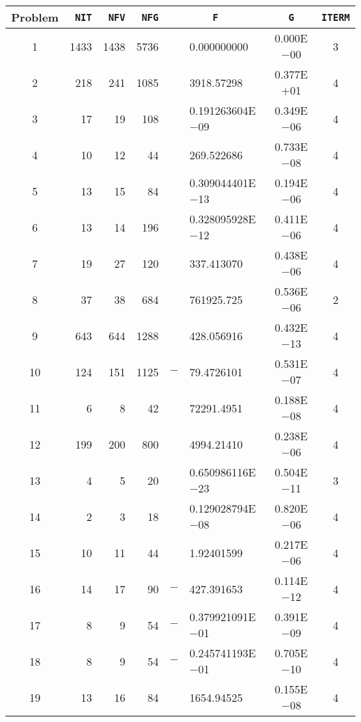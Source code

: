 \documentclass{esub2acm}
\begin{document}
\begin{table}
\footnotesize \centering
\begin{tabular}{c|rrrr@{}lcc} \hline
Problem\rule[-2pt]{0pt}{12pt}  & {\tt NIT} & {\tt NFV} & {\tt NFG}
& \multicolumn{2}{c}{\tt F} & {\tt G} & {\tt ITERM} \\ \hline
1\rule[-2pt]{0pt}{12pt} &   1433    &   1438    &   5736    &     &   0.000000000   &   0.000E$-$00 &   3   \\
2   &  218  &   241 &  1085 &       &   3918.57298  &   0.377E$+$01 &   4   \\
3   &   17  &   19  &   108 &       &   0.191263604E$-$09   &   0.349E$-$06 &   4   \\
4   &   10  &   12  &   44  &       &   269.522686  &   0.733E$-$08 &   4   \\
5   &   13  &   15  &   84  &       &   0.309044401E$-$13   &   0.194E$-$06 &   4   \\
6   &   13  &   14  &   196 &       &   0.328095928E$-$12   &   0.411E$-$06 &   4   \\
7   &   19  &   27  &   120 &       &   337.413070  &   0.438E$-$06 &   4   \\
8   &   37  &   38  &   684 &       &   761925.725  &   0.536E$-$06 &   2   \\
9   &   643 &   644 &  1288 &       &   428.056916  &   0.432E$-$13 &   4   \\
10  &   124 &   151 &  1125 &   $-$ &   79.4726101  &   0.531E$-$07 &   4   \\
11  &   6   &   8   &   42  &       &   72291.4951  &   0.188E$-$08 &   4   \\
12  &   199 &   200 &   800 &       &   4994.21410  &   0.238E$-$06 &   4   \\
13  &   4   &   5   &   20  &       &   0.650986116E$-$23   &   0.504E$-$11 &   3   \\
14  &   2   &   3   &   18  &       &   0.129028794E$-$08   &   0.820E$-$06 &   4   \\
15  &   10  &   11  &   44  &       &   1.92401599  &   0.217E$-$06 &   4   \\
16  &   14  &   17  &   90  &   $-$ &   427.391653  &   0.114E$-$12 &   4   \\
17  &   8   &   9   &   54  &   $-$ &   0.379921091E$-$01   &   0.391E$-$09 &   4   \\
18  &   8   &   9   &   54  &   $-$ &   0.245741193E$-$01   &   0.705E$-$10 &   4   \\
19  &   13  &   16  &   84  &       &   1654.94525  &   0.155E$-$08 &   4   \\

\end{tabular}
\end{table}
\end{document}
